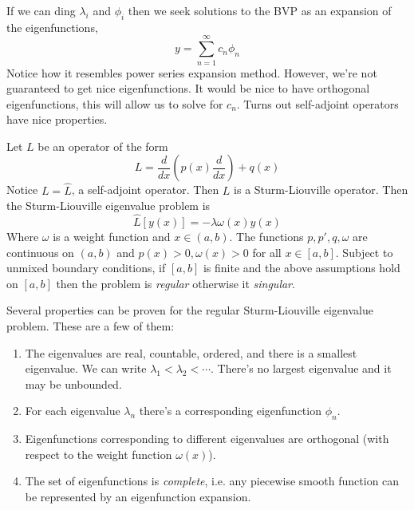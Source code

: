 If we can ding $\lambda_i$ and $\phi_i$ then we seek solutions to the BVP as an expansion
of the eigenfunctions,
\[y=\sum_{n=1}^{\infty} c_n\phi_n\]
Notice how it resembles power series expansion method. However, we're not guaranteed to
get nice eigenfunctions. It would be nice to have orthogonal eigenfunctions, this will
allow us to solve for $c_n$. Turns out self-adjoint operators have nice properties.
\begin{definition}
  Let $L$ be an operator of the form
  \[L= \frac{d}{dx}(p(x)\frac{d}{dx}) + q(x)\]
  Notice $L=\hat{L}$, a self-adjoint operator. Then $L$ is a Sturm-Liouville operator.
  Then the Sturm-Liouville eigenvalue problem is 
  \[\hat{L}[y(x)] = -\lambda \omega(x)y(x)\]
  Where $\omega$ is a weight function and $x\in(a,b)$. The functions $p,p',q,\omega$ are
  continuous on $(a,b)$ and $p(x)>0,\omega(x)>0$ for all $x\in[a,b]$.
  Subject to unmixed boundary conditions, if $[a,b]$ is finite and the above assumptions
  hold on $[a,b]$ then the problem is \emph{regular} otherwise it \emph{singular}.
  \label{def:sturmLiouvilleOp}
\end{definition}
Several properties can be proven for the regular Sturm-Liouville eigenvalue problem. These
are a few of them:
\begin{enumerate}
  \item The eigenvalues are real, countable, ordered, and there is a smallest eigenvalue.
    We can write $\lambda_1<\lambda_2<\cdots$. There's no largest eigenvalue and it may be
    unbounded.
  \item For each eigenvalue $\lambda_n$ there's a corresponding eigenfunction $\phi_n$.
  \item Eigenfunctions corresponding to different eigenvalues are orthogonal (with respect
    to the weight function $\omega(x)$).
  \item The set of eigenfunctions is \emph{complete}, i.e. any piecewise smooth function
    can be represented by an eigenfunction expansion.
\end{enumerate}

